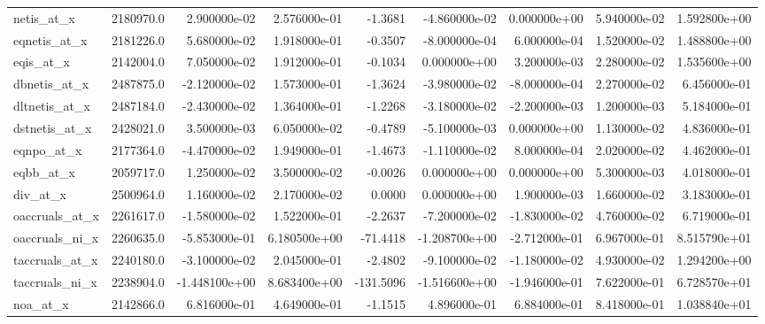 \documentclass[10pt]{article}
\begin{document}
\begin{landscape}
\begin{longtable}{|l|r|r|r|r|r|r|r|r|}
netis\_at\_x              &  2180970.0 &  2.900000e-02 &  2.576000e-01 &     -1.3681 & -4.860000e-02 &  0.000000e+00 &  5.940000e-02 &  1.592800e+00 \\
eqnetis\_at\_x            &  2181226.0 &  5.680000e-02 &  1.918000e-01 &     -0.3507 & -8.000000e-04 &  6.000000e-04 &  1.520000e-02 &  1.488800e+00 \\
eqis\_at\_x               &  2142004.0 &  7.050000e-02 &  1.912000e-01 &     -0.1034 &  0.000000e+00 &  3.200000e-03 &  2.280000e-02 &  1.535600e+00 \\
dbnetis\_at\_x            &  2487875.0 & -2.120000e-02 &  1.573000e-01 &     -1.3624 & -3.980000e-02 & -8.000000e-04 &  2.270000e-02 &  6.456000e-01 \\
dltnetis\_at\_x           &  2487184.0 & -2.430000e-02 &  1.364000e-01 &     -1.2268 & -3.180000e-02 & -2.200000e-03 &  1.200000e-03 &  5.184000e-01 \\
dstnetis\_at\_x           &  2428021.0 &  3.500000e-03 &  6.050000e-02 &     -0.4789 & -5.100000e-03 &  0.000000e+00 &  1.130000e-02 &  4.836000e-01 \\
eqnpo\_at\_x              &  2177364.0 & -4.470000e-02 &  1.949000e-01 &     -1.4673 & -1.110000e-02 &  8.000000e-04 &  2.020000e-02 &  4.462000e-01 \\
eqbb\_at\_x               &  2059717.0 &  1.250000e-02 &  3.500000e-02 &     -0.0026 &  0.000000e+00 &  0.000000e+00 &  5.300000e-03 &  4.018000e-01 \\
div\_at\_x                &  2500964.0 &  1.160000e-02 &  2.170000e-02 &      0.0000 &  0.000000e+00 &  1.900000e-03 &  1.660000e-02 &  3.183000e-01 \\
oaccruals\_at\_x          &  2261617.0 & -1.580000e-02 &  1.522000e-01 &     -2.2637 & -7.200000e-02 & -1.830000e-02 &  4.760000e-02 &  6.719000e-01 \\
oaccruals\_ni\_x          &  2260635.0 & -5.853000e-01 &  6.180500e+00 &    -71.4418 & -1.208700e+00 & -2.712000e-01 &  6.967000e-01 &  8.515790e+01 \\
taccruals\_at\_x          &  2240180.0 & -3.100000e-02 &  2.045000e-01 &     -2.4802 & -9.100000e-02 & -1.180000e-02 &  4.930000e-02 &  1.294200e+00 \\
taccruals\_ni\_x          &  2238904.0 & -1.448100e+00 &  8.683400e+00 &   -131.5096 & -1.516600e+00 & -1.946000e-01 &  7.622000e-01 &  6.728570e+01 \\
noa\_at\_x                &  2142866.0 &  6.816000e-01 &  4.649000e-01 &     -1.1515 &  4.896000e-01 &  6.884000e-01 &  8.418000e-01 &  1.038840e+01 \\

\end{longtable}
\end{landscape}
\end{document}
